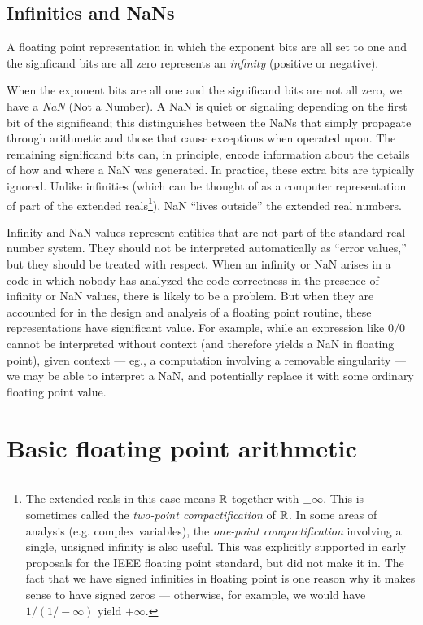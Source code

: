 \documentclass[12pt, leqno]{article} %
\begin{document}
\subsection{Infinities and NaNs}

A floating point representation in which the exponent bits are all
set to one and the signficand bits are all zero represents
an {\em infinity} (positive or negative).

When the exponent bits are all one and the significand bits are not all
zero, we have a {\em NaN} (Not a Number).  A NaN is quiet or signaling
depending on the first bit of the significand; this distinguishes
between the NaNs that simply propagate through arithmetic and those that
cause exceptions when operated upon.  The remaining significand bits
can, in principle, encode information about the details of how and where
a NaN was generated.  In practice, these extra bits are typically
ignored.  Unlike infinities (which can be thought of as a computer
representation of part of the extended reals\footnote{%
The extended reals in this case means $\mathbb{R}$ together with $\pm \infty$.
This is sometimes called the {\em two-point compactification} of $\mathbb{R}$.
In some areas of analysis (e.g. complex variables),
the {\em one-point compactification} involving a single, unsigned
infinity is also useful.  This was explicitly supported in early
proposals for the IEEE floating point standard, but did not make it in.
The fact that we have signed infinities in floating point is one reason
why it makes sense to have signed zeros --- otherwise, for example,
we would have $1/(1/-\infty)$ yield $+\infty$.
}), NaN ``lives outside'' the extended real numbers.

Infinity and NaN values represent entities that are not part of the
standard real number system.  They should not be interpreted
automatically as ``error values,'' but they should be treated with
respect.  When an infinity or NaN arises in a code
in which nobody has analyzed the code correctness in the presence
of infinity or NaN values, there is likely to be a problem.  But
when they are accounted for in the design and analysis of a floating
point routine, these representations have significant
value.  For example, while an expression like $0/0$ cannot be
interpreted without context (and therefore yields a NaN in floating
point), given context --- eg., a computation involving a removable
singularity --- we may be able to interpret a NaN, and potentially
replace it with some ordinary floating point value.

\section{Basic floating point arithmetic}
\end{document}
